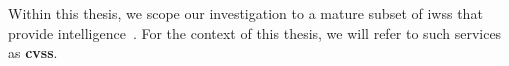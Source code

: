 
\begin{callout}
Within this thesis, we scope our investigation to a mature \textup{subset} of \glspl{iws} that provide  intelligence~. For the context of this thesis, we will refer to such services as \textbf{\glspl{cvs}}. 
\end{callout}



